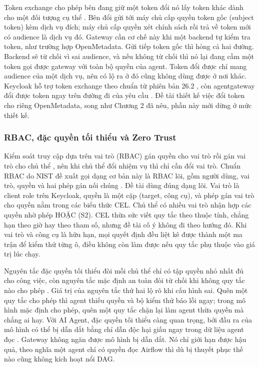 \documentclass[a4paper]{article}
\begin{document}
Token exchange cho phép bên đang giữ một token đổi nó lấy token khác dành cho một đối tượng cụ thể \parencite{rfc8693}. Bên đổi gửi tới máy chủ cấp quyền token gốc (subject token) kèm dịch vụ đích; máy chủ cấp quyền xét chính sách rồi trả về token mới có audience là dịch vụ đó. Gateway cần cơ chế này khi một backend tự kiểm tra token, như trường hợp OpenMetadata. Gửi tiếp token gốc thì hỏng cả hai đường. Backend sẽ từ chối vì sai audience, và nếu không từ chối thì nó lại đang cầm một token gọi được gateway với toàn bộ quyền của agent. Token đổi được chỉ mang audience của một dịch vụ, nên có lộ ra ở đó cũng không dùng được ở nơi khác. Keycloak hỗ trợ token exchange theo chuẩn từ phiên bản 26.2 \parencite{keycloak_tokenexchange,graziano2025ste}, còn agentgateway đổi được token ngay trên đường đi của yêu cầu \parencite{agw_tokenexchange}. Đề tài thiết kế việc đổi token cho riêng OpenMetadata, song như Chương 2 đã nêu, phần này mới dừng ở mức thiết kế.

\subsubsection{RBAC, đặc quyền tối thiểu và Zero Trust}

Kiểm soát truy cập dựa trên vai trò (RBAC) gán quyền cho vai trò rồi gán vai trò cho chủ thể \parencite{sandhu1996rbac}, nên khi chủ thể đổi nhiệm vụ thì chỉ cần đổi vai trò. Chuẩn RBAC do NIST đề xuất gọi dạng cơ bản này là RBAC lõi, gồm người dùng, vai trò, quyền và hai phép gán nối chúng \parencite{ferraiolo2001nist}. Đề tài dùng đúng dạng lõi. Vai trò là client role trên Keycloak, quyền là một cặp (target, công cụ), và phép gán vai trò cho quyền nằm trong các biểu thức CEL. Chủ thể có nhiều vai trò nhận hợp các quyền nhờ phép HOẶC (S2). CEL thừa sức viết quy tắc theo thuộc tính, chẳng hạn theo giờ hay theo tham số, nhưng đề tài cố ý không đi theo hướng đó. Khi vai trò và công cụ là hữu hạn, mọi quyết định đều liệt kê được thành một ma trận để kiểm thử từng ô, điều không còn làm được nếu quy tắc phụ thuộc vào giá trị lúc chạy.

Nguyên tắc đặc quyền tối thiểu đòi mỗi chủ thể chỉ có tập quyền nhỏ nhất đủ cho công việc, còn nguyên tắc mặc định an toàn đòi từ chối khi không quy tắc nào cho phép \parencite{saltzer1975protection}. Giá trị của nguyên tắc thứ hai lộ rõ khi cấu hình sai. Quên một quy tắc cho phép thì agent thiếu quyền và bộ kiểm thử báo lỗi ngay; trong mô hình mặc định cho phép, quên một quy tắc chặn lại làm agent thừa quyền mà chẳng ai hay. Với AI Agent, đặc quyền tối thiểu càng quan trọng, bởi đầu ra của mô hình có thể bị dẫn dắt bằng chỉ dẫn độc hại giấu ngay trong dữ liệu agent đọc \parencite{breakingmcp}. Gateway không ngăn được mô hình bị dẫn dắt. Nó chỉ giới hạn được hậu quả, theo nghĩa một agent chỉ có quyền đọc Airflow thì dù bị thuyết phục thế nào cũng không kích hoạt nổi DAG.
\end{document}

